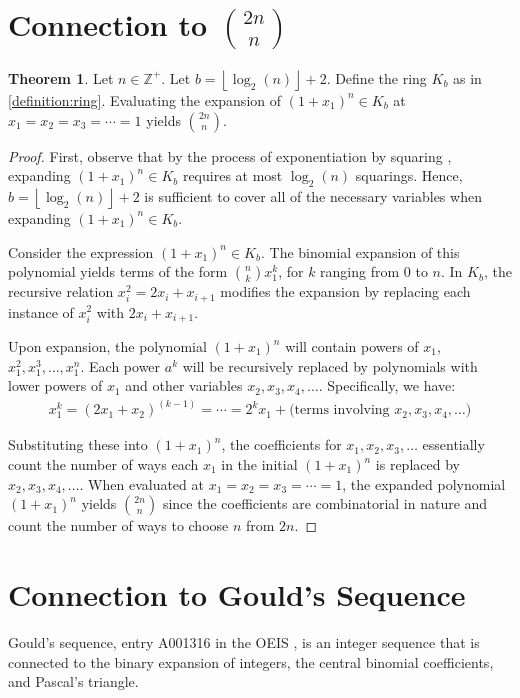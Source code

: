 \documentclass{article}
\theoremstyle{plain}
\theoremstyle{definition}
\newtheorem{theorem}{Theorem}
\newcommand{\floor}[1]{\left\lfloor #1 \right\rfloor}
\newcommand{\Z}{\mathbb{Z}}
\newcommand{\K}{K}
\begin{document}
\section[Connection to Central Binomial Coefficients]{Connection to $\binom{2n}{n}$} \label{section:cbc}
\begin{theorem} \label{theorem:cbc}
Let $n \in \Z^+$. Let $b={\floor{\log_2(n)}+2}$. Define the ring $\K_b$ as in \cref{definition:ring}. Evaluating the expansion of $(1+x_1)^n \in \K_b$ at $x_1=x_2=x_3=\cdots=1$ yields $\binom{2n}{n}$.
\end{theorem}
\begin{proof}
First, observe that by the process of exponentiation by squaring \cite{knuth1997art}, expanding $(1+x_1)^n \in \K_b$ requires at most $\log_2(n)$ squarings. Hence, $b={\floor{\log_2(n)}+2}$ is sufficient to cover all of the necessary variables when expanding $(1+x_1)^n \in \K_b$.

Consider the expression $(1+x_1)^n \in \K_b$. The binomial expansion of this polynomial yields terms of the form $\binom{n}{k} x_1^k$, for $k$ ranging from $0$ to $n$. In $\K_b$, the recursive relation $x_i^2 = 2x_i + x_{i+1}$ modifies the expansion by replacing each instance of $x_i^2$ with $2x_i + x_{i+1}$.

Upon expansion, the polynomial $(1+x_1)^n$ will contain powers of $x_1$, $x_1^2, x_1^3, \ldots, x_1^n$. Each power $a^k$ will be recursively replaced by polynomials with lower powers of $x_1$ and other variables $x_2, x_3, x_4, \ldots$. Specifically, we have:
\begin{align}
    x_1^k = (2x_1+x_2)^{(k-1)} = \cdots = 2^k x_1 + \text{(terms involving $x_2, x_3, x_4, \ldots$)}
\end{align}

Substituting these into $(1+x_1)^n$, the coefficients for $x_1, x_2, x_3, \ldots$ essentially count the number of ways each $x_1$ in the initial $(1+x_1)^n$ is replaced by $x_2, x_3, x_4, \ldots$. When evaluated at $x_1=x_2=x_3=\cdots=1$, the expanded polynomial $(1+x_1)^n$ yields $\binom{2n}{n}$ since the coefficients are combinatorial in nature and count the number of ways to choose $n$ from $2n$.
\end{proof}

\section{Connection to Gould's Sequence} \label{section:goulds}

Gould's sequence, entry A001316 in the OEIS \cite{A001316}, is an integer sequence that is connected to the binary expansion of integers, the central binomial coefficients, and Pascal's triangle.
\end{document}
